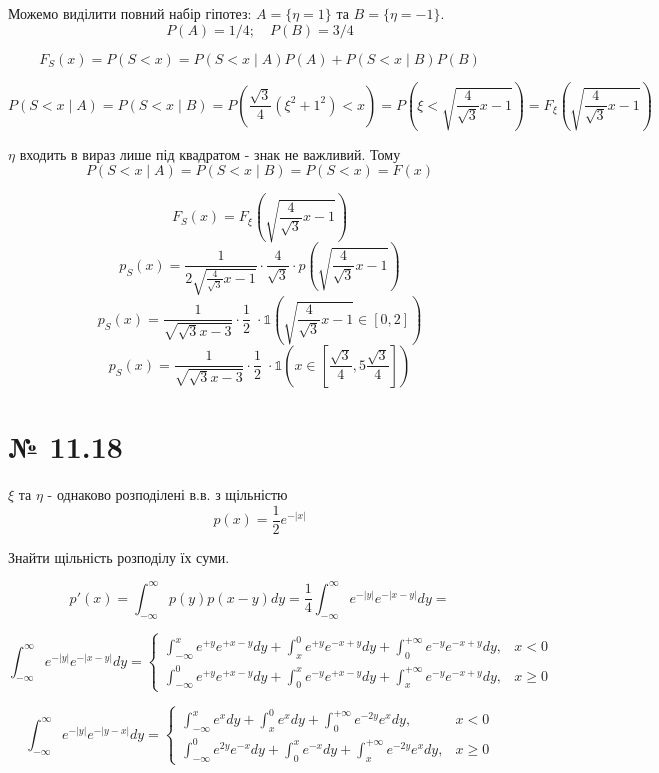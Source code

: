 \documentclass[11pt, a4paper]{article} %
\begin{document}
Можемо виділити повний набір гіпотез: $A=\{\eta=1\}$ та $B=\{\eta=-1\}$.
$$P(A) = 1/4;\quad P(B) = 3/4$$

$$F_S(x) = P(S<x) = P(S<x \;|\; A)P(A) + P(S<x \;|\; B)P(B)$$

$$P(S<x \;|\; A) = P(S<x \;|\; B) = P(\frac{\sqrt 3}{4}\left(\xi^2 + 1^2\right) < x) 
= P(\xi < \sqrt{\frac{4}{\sqrt 3}x - 1}) = F_{\xi}(\sqrt{\frac{4}{\sqrt 3}x - 1})$$

$\eta$ входить в вираз лише під квадратом - знак не важливий. Тому
$$P(S<x \;|\; A) = P(S<x \;|\; B) = P(S<x) = F(x)$$

$$F_S(x) = F_{\xi}(\sqrt{\frac{4}{\sqrt 3}x - 1})$$
$$p_S(x) = \frac{1}{2\sqrt{\frac{4}{\sqrt 3}x - 1}} \cdot \frac{4}{\sqrt 3} \cdot p(\sqrt{\frac{4}{\sqrt 3}x - 1}) $$
$$p_S(x) = \frac{1}{\sqrt{\sqrt{3} x - 3}} \cdot \frac{1}{2} \; \cdot \mathbb{1}\left(\sqrt{\frac{4}{\sqrt 3}x - 1} \in [0,2]\right) $$
$$p_S(x) = \frac{1}{\sqrt{\sqrt{3} x - 3}} \cdot \frac{1}{2} \; \cdot \mathbb{1}\left(x \in [\frac{\sqrt 3}{4},5\frac{\sqrt 3}{4}]\right) $$



\section*{№ 11.18}
\begin{mdframed}
    $\xi$ та $\eta$ - однаково розподілені в.в. з щільністю
    $$p(x) = \frac{1}{2}e^{-|x|}$$

    Знайти щільність розподілу їх суми.
\end{mdframed}

$$p'(x) = \int_{-\infty}^\infty p(y)p(x-y) dy =
 \frac{1}{4} \int_{-\infty}^\infty e^{-|y|}e^{-|x-y|} dy = $$

$$\int_{-\infty}^\infty e^{-|y|}e^{-|x-y|} dy = \begin{cases}
    \int_{-\infty}^x e^{+y}e^{+x-y} dy + \int_{x}^0 e^{+y}e^{-x+y} dy 
    + \int_{0}^{+\infty} e^{-y}e^{-x+y} dy ,& x<0 \\
    \int_{-\infty}^0 e^{+y}e^{+x-y} dy + \int_{0}^x e^{-y}e^{+x-y} dy 
    + \int_{x}^{+\infty} e^{-y}e^{-x+y} dy ,& x\ge 0 
\end{cases}$$

$$\int_{-\infty}^\infty e^{-|y|}e^{-|y-x|} dy = \begin{cases}
    \int_{-\infty}^x e^{x} dy + \int_{x}^0 e^{x} dy 
    + \int_{0}^{+\infty} e^{-2y}e^{x} dy ,& x<0 \\
    \int_{-\infty}^0 e^{2y}e^{-x} dy + \int_{0}^x e^{-x} dy 
    + \int_{x}^{+\infty} e^{-2y}e^{x} dy ,& x\ge 0 
\end{cases}$$
\end{document}
